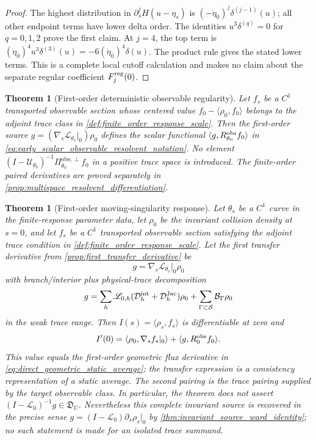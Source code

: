 \documentclass[11pt]{amsart}
\theoremstyle{compactplain}
\newtheorem{theorem}{Theorem}[section]
\newtheorem*{theorem*}{Theorem}
\theoremstyle{compactdefinition}
\theoremstyle{compactremark}
\newcommand{\Ltransfer}{\mathscr L}
\newcommand{\Ssing}{\mathcal S}
\newcommand{\Piobsperp}{\Pi^{\mathrm{obs},\perp}}
\begin{document}
\begin{proof}
The highest distribution in \(\partial_s^jH(u-\eta_s)\) is
\((-\dot\eta_0)^j\delta^{(j-1)}(u)\); all other endpoint terms have lower delta
order.  The identities \(u^3\delta^{(q)}=0\) for \(q=0,1,2\) prove the first
claim.  At \(j=4\), the top term is
\((\dot\eta_0)^4u^3\delta^{(3)}(u)=-6(\dot\eta_0)^4\delta(u)\).
The product rule gives the stated lower terms.  This is a complete local cutoff
calculation and makes no claim about the separate regular coefficient
\(F_j^{\rm reg}(0)\).
\end{proof}

\begin{theorem*}[First-order deterministic observable regularity]
Let \(f_s\) be a \(C^1\) transported observable section whose centered value
\(f_0-\langle\rho_0,f_0\rangle\) belongs to the adjoint trace class in
\cref{def:finite_order_response_scale}.  Then the first-order source
\(g=(\nabla_s\Ltransfer_{\theta_s}|_0)\rho_0\) defines the scalar functional
\(\langle g,R_{\theta_0}^{\rm obs}f_0\rangle\) in
\eqref{eq:early_scalar_observable_resolvent_notation}.  No element
\((I-\mathscr U_{\theta_0})^{-1}\Piobsperp_{\theta_0}f_0\) in a positive trace
space is introduced.  The finite-order paired derivatives are proved
separately in \cref{prop:multispace_resolvent_differentiation}.
\end{theorem*}


\begin{theorem}[First-order moving-singularity response]
\label{thm:moving_singularity_response}
Let \(\theta_s\) be a \(C^1\) curve in the finite-response parameter data,
let \(\rho_0\) be the invariant collision density at \(s=0\), and let \(f_s\)
be a \(C^1\) transported observable section satisfying the adjoint trace
condition in \cref{def:finite_order_response_scale}.  Let the first transfer
derivative from \cref{prop:first_transfer_derivative} be
\[
  g=\nabla_s\Ltransfer_{\theta_s}|_0\rho_0
\]
with branch/interior plus physical-trace decomposition
\[
  g=\sum_h\Ltransfer_{0,h}
  (\mathcal D_h^{\rm int}+\mathcal D_h^{\rm Jac})\rho_0
  +\sum_{\Gamma\subset\Ssing}\mathcal B_\Gamma\rho_0
\]
in the weak trace range.  Then \(I(s)=\langle\rho_s,f_s\rangle\) is
differentiable at zero and
\begin{equation}
\label{eq:first_order_observable_response}
  I'(0)=
  \langle\rho_0,\nabla_s f_s|_0\rangle
  +\langle g,R_0^{\rm obs}f_0\rangle .
\end{equation}
This value equals the first-order geometric flux derivative in
\eqref{eq:direct_geometric_static_average}; the transfer expression is a
consistency representation of a static average.
The second pairing is the trace pairing supplied by the target observable
class.  In particular, the theorem does not assert
\((I-\Ltransfer_0)^{-1}g\in\mathfrak D_U\).
Nevertheless this \emph{complete invariant source} is recovered in the precise
sense
\(g=(I-\Ltransfer_0)\partial_s\rho_s|_0\) by
\cref{thm:invariant_source_ward_identity}; no such statement is made for an
isolated trace summand.
\end{theorem}
\end{document}
